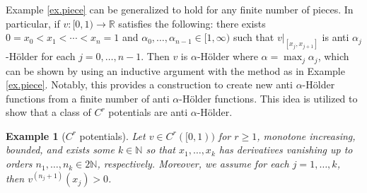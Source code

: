 \documentclass{amsart}
\newtheorem{example}{Example}
\newcommand{\NN}{\mathbb{N}}
\newcommand{\RR}{\mathbb{R}}
\begin{document}
Example \ref{ex.piece} can be generalized to hold for any finite number of pieces. In particular, if $v:[0,1) \rightarrow \RR$ satisfies the following: there exists $0 = x_0 < x_1 < \cdots < x_n = 1$ and $\alpha_0,\dots, \alpha_{n-1}\in [1,\infty)$ such that $v|_{[x_j,x_{j+1}]}$ is anti $\alpha_j$-H\"older for each $j = 0, \dots, n-1$. Then $v$ is $\alpha$-H\"older where $\alpha = \max_j \alpha_j$, which can be shown by using an inductive argument with the method as in Example \ref{ex.piece}. Notably, this provides a construction to create new anti $\alpha$-H\"older functions from a finite number of anti $\alpha$-H\"older functions. This idea is utilized to show that a class of $C^r$ potentials are anti $\alpha$-H\"older.

\begin{example}[$C^r$ potentials]\label{ex.Cr}
    Let $v\in C^{r}([0,1))$ for $r\geq 1$, monotone increasing, bounded, and exists some $k\in\NN$ so that $x_1,\dots, x_k$ has derivatives vanishing up to orders $n_1,\dots, n_k \in 2\NN$, respectively. Moreover, we assume for each $j = 1,\dots, k$, then $v^{(n_j + 1)}(x_j) > 0$. 
    

\end{example}
\end{document}
